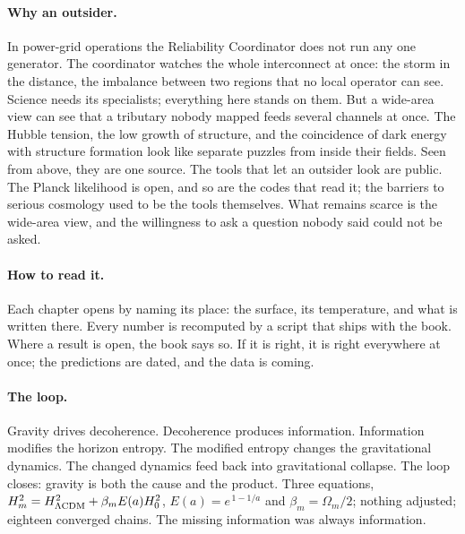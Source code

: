 \paragraph{Why an outsider.} In power-grid operations the Reliability Coordinator does not run any one generator. The coordinator watches the
whole interconnect at once: the storm in the distance, the imbalance between two regions that no local operator can see. Science needs its
specialists; everything here stands on them. But a wide-area view can see that a tributary nobody mapped feeds several channels at once. The
Hubble tension, the low growth of structure, and the coincidence of dark energy with structure formation look like separate puzzles from inside
their fields. Seen from above, they are one source.
The tools that let an outsider look are public. The Planck likelihood is open, and so are the codes that read it; the barriers to
serious cosmology used to be the tools themselves. What remains scarce is the wide-area view, and the willingness to ask a question
nobody said could not be asked.

\paragraph{How to read it.} Each chapter opens by naming its place: the surface, its temperature, and what is written there. Every number is
recomputed by a script that ships with the book. Where a result is open, the book says so. If it is right, it is right everywhere at once;
the predictions are dated, and the data is coming.

\paragraph{The loop.} Gravity drives decoherence. Decoherence produces information. Information modifies the horizon entropy. The modified
entropy changes the gravitational dynamics. The changed dynamics feed back into gravitational collapse. The loop closes: gravity is both the
cause and the product. \interp{} Three equations, $H_m^2=H^2_{\Lambda{\rm CDM}}+\beta_mE(a)H_0^2$, $E(a)=e^{\,1-1/a}$ and $\beta_m=\Omega_m/2$;
nothing adjusted; eighteen converged chains. The missing information was always information.

